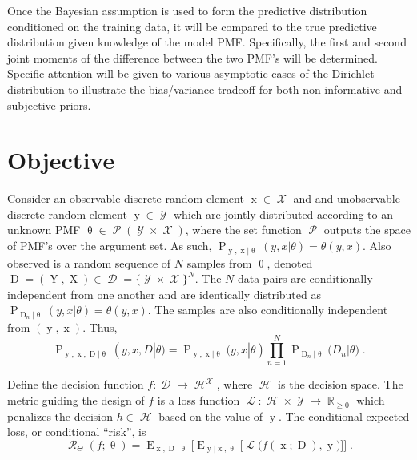 \documentclass[conference]{IEEEtran}
\DeclareMathOperator{\xrm}{\mathrm{x}}
\DeclareMathOperator{\Xrm}{\mathrm{X}}
\DeclareMathOperator{\yrm}{\mathrm{y}}
\DeclareMathOperator{\Yrm}{\mathrm{Y}}
\DeclareMathOperator{\Drm}{\mathrm{D}}
\DeclareMathOperator{\Prm}{\mathrm{P}}
\DeclareMathOperator{\Erm}{\mathrm{E}}
\DeclareMathOperator{\Xcal}{\mathcal{X}}
\DeclareMathOperator{\Ycal}{\mathcal{Y}}
\DeclareMathOperator{\Dcal}{\mathcal{D}}
\DeclareMathOperator{\Hcal}{\mathcal{H}}
\DeclareMathOperator{\Rcal}{\mathcal{R}}
\DeclareMathOperator{\Pcal}{\mathcal{P}}
\DeclareMathOperator{\Lcal}{\mathcal{L}}
\DeclareMathOperator{\Rbb}{\mathbb{R}}
\begin{document}
Once the Bayesian assumption is used to form the predictive distribution conditioned on the training data, it will be compared to the true predictive distribution given knowledge of the model PMF. Specifically, the first and second joint moments of the difference between the two PMF's will be determined. Specific attention will be given to various asymptotic cases of the Dirichlet distribution to illustrate the bias/variance tradeoff for both non-informative and subjective priors.







\section{Objective} \label{sec:objective}

Consider an observable discrete random element $\xrm \in \Xcal$ and and unobservable discrete random element $\yrm \in \Ycal$ which are jointly distributed according to an unknown PMF $\uptheta \in \Pcal(\Ycal \times \Xcal)$, where the set function $\Pcal$ outputs the space of PMF's over the argument set. As such, $\Prm_{\yrm,\xrm | \uptheta}(y,x | \theta) = \theta(y,x)$. Also observed is a random sequence of $N$ samples from $\uptheta$, denoted $\Drm = (\Yrm,\Xrm) \in \Dcal = \{\Ycal \times \Xcal\}^N$. The $N$ data pairs are conditionally independent from one another and are identically distributed as $\Prm_{\Drm_n | \uptheta}(y,x | \theta) = \theta(y,x)$. The samples are also conditionally independent from $(\yrm,\xrm)$. Thus,
\begin{equation}
\Prm_{\yrm,\xrm,\Drm | \uptheta}(y,x,D | \theta) = \Prm_{\yrm,\xrm | \uptheta}(y,x | \theta) \prod_{n=1}^N \Prm_{ \Drm_n | \uptheta }\big( D_n | \theta \big) \;.
\end{equation}

Define the decision function $f: \Dcal \mapsto \Hcal^{\Xcal}$, where $\Hcal$ is the decision space. The metric guiding the design of $f$ is a loss function $\Lcal: \Hcal \times \Ycal \mapsto \Rbb_{\geq 0}$ which penalizes the decision $h \in \Hcal$ based on the value of $\yrm$. The conditional expected loss, or conditional ``risk'', is
\begin{equation} \label{eq:risk_cond}
\Rcal_{\Theta}(f ; \uptheta) = \Erm_{\xrm,\Drm | \uptheta} \bigg[ \Erm_{\yrm | \xrm,\uptheta} \Big[ \Lcal\big( f(\xrm;\Drm),\yrm \big) \Big] \bigg] \;.
\end{equation}
\end{document}
